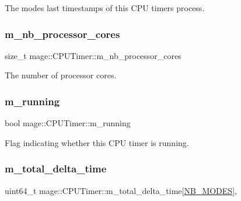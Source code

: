 The modes\textquotesingle{} last timestamps of this C\+PU timer\textquotesingle{}s process. \hypertarget{classmage_1_1_c_p_u_timer_ac5fdb38a70c74815231b5efd8d746be1}{}\label{classmage_1_1_c_p_u_timer_ac5fdb38a70c74815231b5efd8d746be1} 
\subsubsection{\texorpdfstring{m\+\_\+nb\+\_\+processor\+\_\+cores}{m\_nb\_processor\_cores}}
{\footnotesize\ttfamily size\+\_\+t mage\+::\+C\+P\+U\+Timer\+::m\+\_\+nb\+\_\+processor\+\_\+cores\hspace{0.3cm}{\ttfamily [private]}}

The number of processor cores. \hypertarget{classmage_1_1_c_p_u_timer_a7190afa453085b7bbd7cb76ff6bb62f2}{}\label{classmage_1_1_c_p_u_timer_a7190afa453085b7bbd7cb76ff6bb62f2} 
\subsubsection{\texorpdfstring{m\+\_\+running}{m\_running}}
{\footnotesize\ttfamily bool mage\+::\+C\+P\+U\+Timer\+::m\+\_\+running\hspace{0.3cm}{\ttfamily [private]}}

Flag indicating whether this C\+PU timer is running. \hypertarget{classmage_1_1_c_p_u_timer_aa4b96eea0eb0cc3e5d5a4bb7a343a4f6}{}\label{classmage_1_1_c_p_u_timer_aa4b96eea0eb0cc3e5d5a4bb7a343a4f6} 
\subsubsection{\texorpdfstring{m\+\_\+total\+\_\+delta\+\_\+time}{m\_total\_delta\_time}}
{\footnotesize\ttfamily uint64\+\_\+t mage\+::\+C\+P\+U\+Timer\+::m\+\_\+total\+\_\+delta\+\_\+time\mbox{[}\hyperlink{classmage_1_1_c_p_u_timer_a5adc0497956723a35534dfeb66fa7789ab63e6023ec0bea89568ebb2b98728b77}{N\+B\+\_\+\+M\+O\+D\+ES}\mbox{]}\hspace{0.3cm}{\ttfamily [mutable]}, {\ttfamily [private]}}

